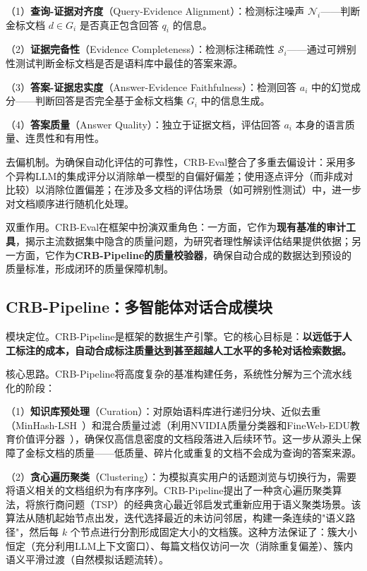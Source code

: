 （1）\textbf{查询-证据对齐度}（Query-Evidence Alignment）：检测标注噪声 $\mathcal{N}_i$——判断金标文档 $d \in G_i$ 是否真正包含回答 $q_i$ 的信息。

（2）\textbf{证据完备性}（Evidence Completeness）：检测标注稀疏性 $\mathcal{S}_i$——通过可辨别性测试判断金标文档是否是语料库中最佳的答案来源。

（3）\textbf{答案-证据忠实度}（Answer-Evidence Faithfulness）：检测回答 $a_i$ 中的幻觉成分——判断回答是否完全基于金标文档集 $G_i$ 中的信息生成。

（4）\textbf{答案质量}（Answer Quality）：独立于证据文档，评估回答 $a_i$ 本身的语言质量、连贯性和有用性。


去偏机制。为确保自动化评估的可靠性，CRB-Eval整合了多重去偏设计：采用多个异构LLM的集成评分以消除单一模型的自偏好偏差；使用逐点评分（而非成对比较）以消除位置偏差；在涉及多文档的评估场景（如可辨别性测试）中，进一步对文档顺序进行随机化处理。

双重作用。CRB-Eval在框架中扮演双重角色：一方面，它作为\textbf{现有基准的审计工具}，揭示主流数据集中隐含的质量问题，为研究者理性解读评估结果提供依据；另一方面，它作为\textbf{CRB-Pipeline的质量校验器}，确保自动合成的数据达到预设的质量标准，形成闭环的质量保障机制。

\subsection{CRB-Pipeline：多智能体对话合成模块}

模块定位。CRB-Pipeline是框架的数据生产引擎。它的核心目标是：\textbf{以远低于人工标注的成本，自动合成标注质量达到甚至超越人工水平的多轮对话检索数据。}

核心思路。CRB-Pipeline将高度复杂的基准构建任务，系统性分解为三个流水线化的阶段：

（1）\textbf{知识库预处理}（Curation）：对原始语料库进行递归分块、近似去重（MinHash-LSH~\citep{broder1997resemblance}）和混合质量过滤（利用NVIDIA质量分类器和FineWeb-EDU教育价值评分器~\citep{penedo2024finewebdatasets}），确保仅高信息密度的文档段落进入后续环节。这一步从源头上保障了金标文档的质量——低质量、碎片化或重复的文档不会成为查询的答案来源。
    
（2）\textbf{贪心遍历聚类}（Clustering）：为模拟真实用户的话题浏览与切换行为，需要将语义相关的文档组织为有序序列。CRB-Pipeline提出了一种贪心遍历聚类算法，将旅行商问题（TSP）的经典贪心最近邻启发式重新应用于语义聚类场景。该算法从随机起始节点出发，迭代选择最近的未访问邻居，构建一条连续的"语义路径"，然后每 $k$ 个节点进行分割形成固定大小的文档簇。这种方法保证了：簇大小恒定（充分利用LLM上下文窗口）、每篇文档仅访问一次（消除重复偏差）、簇内语义平滑过渡（自然模拟话题流转）。
    
